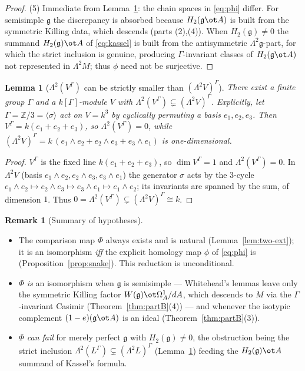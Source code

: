 \documentclass{amsart}
\newtheorem{lemma}{Lemma}
\theoremstyle{definition}
\newtheorem{remark}{Remark}
\newcommand{\g}{\mathfrak{g}}
\newcommand{\Om}{\Omega}
\newcommand{\Gm}{\Gamma}
\begin{document}
\begin{proof}
\smallskip
(5) Immediate from Lemma~\ref{lem:strict}: the chain spaces in \eqref{eq:phi}
differ.  For semisimple $\g$ the discrepancy is absorbed because $H_2(\g\ot A)$ is
built from the symmetric Killing data, which descends (parts (2),(4)).  When
$H_2(\g)\ne0$ the summand $H_2(\g)\ot A$ of \eqref{eq:kassel} is built from the
antisymmetric $\Lambda^2\g$-part, for which the strict inclusion is genuine,
producing $\Gm$-invariant classes of $H_2(\g\ot A)$ not represented in
$\Lambda^2 M$; thus $\phi$ need not be surjective.
\end{proof}

\begin{lemma}[$\Lambda^2(V^{\Gm})$ can be strictly smaller than $(\Lambda^2V)^{\Gm}$]
\label{lem:strict}
There exist a finite group $\Gm$ and a $k[\Gm]$-module $V$ with
$\Lambda^2(V^{\Gm})\subsetneq(\Lambda^2 V)^{\Gm}$.  Explicitly, let
$\Gm=\mathbb Z/3=\langle\sigma\rangle$ act on $V=k^3$ by cyclically permuting a
basis $e_1,e_2,e_3$.  Then $V^{\Gm}=k(e_1+e_2+e_3)$, so $\Lambda^2(V^{\Gm})=0$,
while $(\Lambda^2 V)^{\Gm}=k\,(e_1\wedge e_2+e_2\wedge e_3+e_3\wedge e_1)$ is
one-dimensional.
\end{lemma}
\begin{proof}
$V^{\Gm}$ is the fixed line $k(e_1+e_2+e_3)$, so $\dim V^{\Gm}=1$ and
$\Lambda^2(V^{\Gm})=0$.  In $\Lambda^2 V$ (basis $e_1\wedge e_2,e_2\wedge
e_3,e_3\wedge e_1$) the generator $\sigma$ acts by the $3$-cycle $e_1\wedge
e_2\mapsto e_2\wedge e_3\mapsto e_3\wedge e_1\mapsto e_1\wedge e_2$; its
invariants are spanned by the sum, of dimension $1$.  Thus
$0=\Lambda^2(V^{\Gm})\subsetneq(\Lambda^2V)^{\Gm}\cong k$.
\end{proof}

\begin{remark}[Summary of hypotheses]\label{rem:summary}
\begin{itemize}
\item The comparison map $\Phi$ always exists and is natural
(Lemma~\ref{lem:two-ext}); it is an isomorphism \emph{iff} the explicit homology
map $\phi$ of \eqref{eq:phi} is (Proposition~\ref{prop:snake}).  This reduction is
unconditional.
\item $\Phi$ \emph{is} an isomorphism when $\g$ is semisimple — Whitehead's lemmas
leave only the symmetric Killing factor $W(\g)\ot\Om^1_A/dA$, which descends to
$M$ via the $\Gm$-invariant Casimir (Theorem~\ref{thm:partB}(4)) — and whenever
the isotypic complement $(1-e)(\g\ot A)$ is an ideal
(Theorem~\ref{thm:partB}(3)).
\item $\Phi$ \emph{can fail} for merely perfect $\g$ with $H_2(\g)\ne0$, the
obstruction being the strict inclusion $\Lambda^2(L^{\Gm})\subsetneq(\Lambda^2
L)^{\Gm}$ (Lemma~\ref{lem:strict}) feeding the $H_2(\g)\ot A$ summand of Kassel's
formula.
\end{itemize}
\end{remark}
\end{document}
